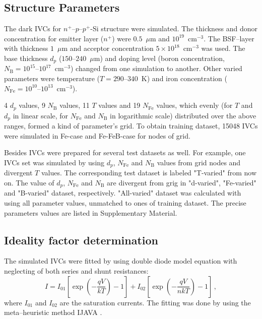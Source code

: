 \documentclass[journal]{IEEEtran}
\begin{document}
\subsection{Structure Parameters}

The dark IVCs for $n^+$--$p$--$p^+$-Si structure were simulated.
The thickness and donor concentration for emitter layer ($n^+$) were $0.5$~$\mu$m and $10^{19}$~cm$^{-3}$.
The BSF--layer with thickness  $1$~$\mu$m and acceptor concentration $5\times10^{18}$~cm$^{-3}$ was used.
The base thickness $d_p$ ($150$--$240$~$\mu$m) and doping level (boron concentration, $N_\mathrm{B}=10^{15}$--$10^{17}$~cm$^{-3}$) changed from one simulation to another.
Other varied parameters were temperature ($T=290$--$340$~K) and iron concentration ($N_{\mathrm{Fe}}=10^{10}$--$10^{13}$~cm$^{-3}$).


4 $d_p$ values, 9 $N_\mathrm{B}$ values, 11 $T$ values and 19 $N_{\mathrm{Fe}}$ values, which
evenly
(for $T$ and $d_p$ in linear scale, for $N_{\mathrm{Fe}}$ and $N_\mathrm{B}$ in logarithmic scale)
distributed over the above ranges,
 formed a kind of parameter's grid.
To obtain training dataset, 15048 IVCs were simulated in Fe-case and Fe-FeB-case for nodes of grid.

Besides IVCs were prepared for several test datasets as well.
For example, one IVCs set was simulated by using $d_p$, $N_{\mathrm{Fe}}$ and $N_\mathrm{B}$ values
from grid nodes and divergent $T$ values.
The corresponding test dataset is labeled "T-varied" from now on.
The value of $d_p$, $N_{\mathrm{Fe}}$ and $N_\mathrm{B}$ are divergent from  grig in "d-varied",
"Fe-varied" and "B-varied" dataset, respectively.
"All-varied" dataset was calculated with using all parameter values, unmatched to ones of training dataset.
The precise parameters values are listed in  Supplementary Material.

\subsection{Ideality factor determination}

The simulated IVCs were fitted by using double diode model \cite{Breitenstein2013} equation
with neglecting of both series and shunt resistances:
\begin{equation}
\label{eqIV}
    I=I_{01}\left[\exp\left(-\frac{qV}{kT}\right)-1\right]+ I_{02}\left[\exp\left(-\frac{qV}{nkT}\right)-1\right]\,,
\end{equation}
where
$I_{01}$ and $I_{02}$ are the saturation currents.
The fitting was done by using the meta--heuristic method IJAVA \cite{IJAVA}.
\end{document}
